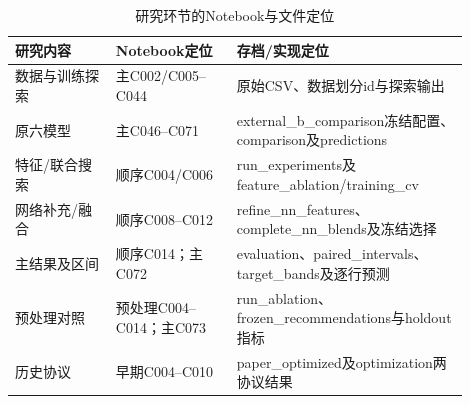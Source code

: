 \begin{table}[htbp]
\footnotesize
\setlength{\tabcolsep}{5pt}
\centering
\caption{研究环节的Notebook与文件定位}
\label{tab:provenance}
\begin{tabular}{L{0.2\linewidth}L{0.24\linewidth}L{0.46\linewidth}}
\toprule
研究内容 & Notebook定位 & 存档/实现定位 \\
\midrule
数据与训练探索 & 主C002/C005--C044 & 原始CSV、数据划分id与探索输出 \\
原六模型 & 主C046--C071 & external\_b\_comparison冻结配置、comparison及predictions \\
特征/联合搜索 & 顺序C004/C006 & run\_experiments及feature\_ablation/training\_cv \\
网络补充/融合 & 顺序C008--C012 & refine\_nn\_features、complete\_nn\_blends及冻结选择 \\
主结果及区间 & 顺序C014；主C072 & evaluation、paired\_intervals、target\_bands及逐行预测 \\
预处理对照 & 预处理C004--C014；主C073 & run\_ablation、frozen\_recommendations与holdout指标 \\
历史协议 & 早期C004--C010 & paper\_optimized及optimization两协议结果 \\
\bottomrule
\end{tabular}
\end{table}

